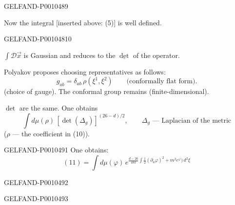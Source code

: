 \begin{GelfandAdjacentEvidence}{GELFAND-P001048}{9}


Now the integral [inserted above: (5)] is well defined.
\end{GelfandAdjacentEvidence}
\begin{GelfandAdjacentEvidence}{GELFAND-P001048}{10}


$\int\mathcal{D}\vec{x}$ is Gaussian and reduces to the $\underline{\det}$ of the operator.

Polyakov proposes choosing representatives as follows:
\begin{equation*}
g_{ab}=\delta_{ab}\,\rho(\xi^1,\xi^2)
\qquad\text{(conformally flat form).}
\tag{10}
\end{equation*}
(choice of gauge). The conformal group remains (finite-dimensional).
\end{GelfandAdjacentEvidence}


$\det$ are the same. One obtains
\begin{equation*}
\int d\mu(\rho)\,[\det(\Delta_g)]^{(26-d)/2},
\qquad\Delta_g\text{ — Laplacian of the metric}
\tag{11}
\end{equation*}
($\rho$ — the coefficient in (10)).


\begin{GelfandAdjacentEvidence}{GELFAND-P001049}{1}
One obtains:
\begin{equation*}
(11)=\int d\mu(\varphi)\,
e^{\frac{d-26}{48\pi}\int\frac12(\partial_a\varphi)^2+
m^{2}e^{\varphi})\,d^2\xi}
\tag{12}
\end{equation*}
\end{GelfandAdjacentEvidence}
\begin{GelfandAdjacentEvidence}{GELFAND-P001049}{2}

\end{GelfandAdjacentEvidence}
\begin{GelfandAdjacentEvidence}{GELFAND-P001049}{3}

\end{GelfandAdjacentEvidence}


